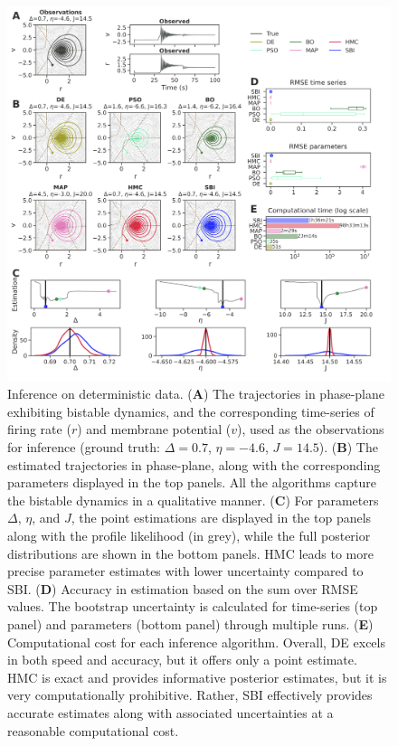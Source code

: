 \documentclass[preprint,11pt,authoryear]{elsarticle}
\begin{document}
\begin{figure}[p]
    \centering
    \includegraphics[width=\linewidth]{Figs/Fig1.png}
    \caption{Inference on deterministic data.  
     (\textbf{A}) The trajectories in phase-plane exhibiting bistable dynamics, and the corresponding time-series of firing rate ($r$) and membrane potential ($v$), used as the observations for inference (ground truth: $\Delta=0.7$, $\eta=-4.6$, $J=14.5$). (\textbf{B}) The estimated trajectories in phase-plane, along with the corresponding parameters displayed in the top panels. All the algorithms capture the bistable dynamics in a qualitative manner. (\textbf{C}) For parameters $\Delta$, $\eta$, and $J$, the point estimations are displayed in the top panels along with the profile likelihood (in grey), while the full posterior distributions are shown in the bottom panels. HMC leads to more precise parameter estimates with lower uncertainty compared to SBI.  (\textbf{D}) Accuracy in estimation based on the sum over RMSE values. The bootstrap uncertainty is calculated for time-series (top panel) and parameters (bottom panel) through multiple runs. (\textbf{E}) Computational cost for each inference algorithm.  Overall, DE excels in both speed and accuracy, but it offers only a point estimate. HMC is exact and provides informative posterior estimates, but it is very computationally prohibitive. Rather, SBI effectively provides accurate estimates along with associated uncertainties at a reasonable computational cost.
    } 
    \label{fig:ODEdata}
\end{figure}
\end{document}
